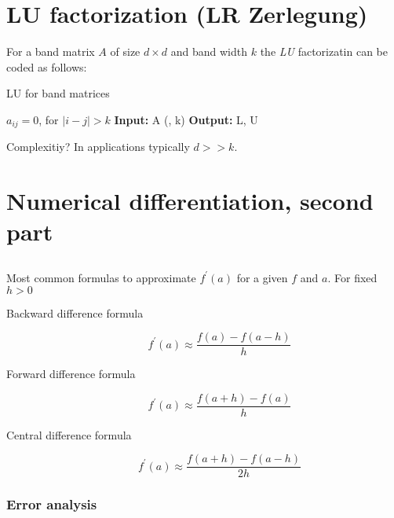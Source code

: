 \chapter{LU factorization (LR Zerlegung)}

For a band matrix $A$ of size $d \times d$ and band width $k$ the \textit{LU}
factorizatin can be coded as follows:

\begin{algorithm}
\caption{LU for band matrices}
\label{alg:lu-band-matrix} 
	\begin{algorithmic}
	    \ENSURE $a_{ij} = 0$, for $|i-j| > k$
	    \textbf{Input:} A (, k)
	    \textbf{Output:} L, U
	     \ENDFOR
	\end{algorithmic}
\end{algorithm}

Complexitiy? In applications typically $d >> k$.

\chapter{Numerical differentiation, second part}

\section{}
Most common formulas to approximate $f^{'}(a)$ for a given $f$ and 
$a$. For fixed $h > 0$

\begin{description}
	\item[Backward difference formula]
		\[f^{'}(a) \approx \frac{f(a) - f(a-h)}{h}\]
	\item[Forward difference formula]
		\[f^{'}(a) \approx \frac{f(a + h) - f(a)}{h}\]
	\item[Central difference formula]
		\[f^{'}(a) \approx \frac{f(a + h) - f(a - h)}{2h}\]
\end{description}

\subsection{Error analysis}

